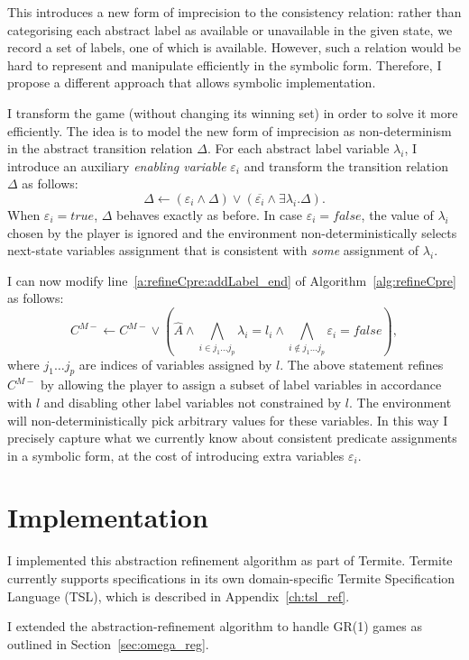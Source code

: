 This introduces a new form of imprecision to the consistency relation: rather than categorising each abstract label as available or unavailable in the given state, we record a set of labels, one of which is available.  However, such a relation would be hard to represent and manipulate efficiently in the symbolic form.  Therefore, I propose a different approach that allows symbolic implementation.  

I transform the game (without changing its winning set) in order to solve it more efficiently.  The idea is to model the new form of imprecision as non-determinism in the abstract transition relation $\Delta$.  For each abstract label variable $\lambda_i$, I introduce an auxiliary \emph{enabling variable} $\varepsilon_i$ and transform the transition relation $\Delta$ as follows:
$$
\Delta \gets (\varepsilon_i \land \Delta) \lor (\overline{\varepsilon_i} \land \exists \lambda_i. \Delta).
$$
When $\varepsilon_i=true$, $\Delta$ behaves exactly as before.  In case $\varepsilon_i=false$, the value of $\lambda_i$ chosen by the player is ignored and the environment non-deterministically selects next-state variables assignment that is consistent with \emph{some} assignment of $\lambda_i$. 

I can now modify line~\ref{a:refineCpre:addLabel_end} of Algorithm~\ref{alg:refineCpre} as follows:
$$
C^{M-} \gets C^{M-} \lor (\hat{A}\land \bigwedge_{i\in{j_1\ldots j_p}}\lambda_i=l_i \land \bigwedge_{i\not\in{j_1\ldots j_p}}\varepsilon_i=false),
$$
where $j_1\ldots j_p$ are indices of variables assigned by $l$.  The above statement refines $C^{M-}$ by allowing the player to assign a subset of label variables in accordance with $l$ and disabling other label variables not constrained by $l$.  The environment will non-deterministically pick arbitrary values for these variables.  In this way I precisely capture what we currently know about consistent predicate assignments in a symbolic form, at the cost of introducing extra variables $\varepsilon_i$.

\section{Implementation}
I implemented this abstraction refinement algorithm as part of Termite. Termite currently supports specifications in its own domain-specific Termite Specification Language (TSL), which is described in Appendix~\ref{ch:tsl_ref}.

I extended the abstraction-refinement algorithm to handle GR(1) games as outlined in Section~\ref{sec:omega_reg}.

